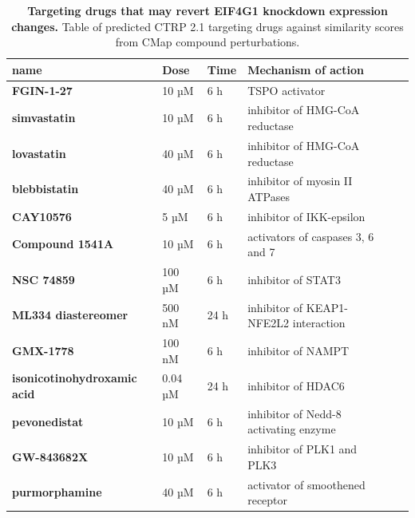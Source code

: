 \begin{table}[!h]
\centering
\footnotesize
\caption[Table of targeting drugs that may revert EIF4G1 knockdown expression changes]{\textbf{Targeting drugs that may revert EIF4G1 knockdown expression changes.} Table of predicted CTRP 2.1 targeting drugs against similarity scores from CMap compound perturbations.}
\label{tab:ctrap-target-revert-table}

\begin{tabular}{llllll}
\toprule
\textbf{name}                       & \textbf{Dose} & \textbf{Time} & \textbf{Mechanism of action} \\
\midrule
\textbf{FGIN-1-27}                  & 10 µM                & 6 h                  & TSPO activator \\
\textbf{simvastatin}                & 10 µM                & 6 h                  & inhibitor of HMG-CoA reductase                                       \\
\textbf{lovastatin}                 & 40 µM                & 6 h                  & inhibitor of HMG-CoA reductase                                       \\
\textbf{blebbistatin}               & 40 µM                & 6 h                  & inhibitor of myosin II ATPases                                       \\
\textbf{CAY10576}                   & 5 µM                 & 6 h                  & inhibitor of IKK-epsilon                                             \\
\textbf{Compound 1541A}             & 10 µM                & 6 h                  & activators of caspases 3, 6 and 7                    \\
\textbf{NSC 74859}                  & 100 µM               & 6 h                  & inhibitor of STAT3                                                   \\
\textbf{ML334 diastereomer}         & 500 nM               & 24 h                 & inhibitor of KEAP1-NFE2L2 interaction                \\
\textbf{GMX-1778}                   & 100 nM               & 6 h                  & inhibitor of NAMPT                  \\
\textbf{isonicotinohydroxamic acid} & 0.04 µM              & 24 h                 & inhibitor of HDAC6                                                   \\
\textbf{pevonedistat}               & 10 µM                & 6 h                  & inhibitor of Nedd-8 activating enzyme                                \\
\textbf{GW-843682X}                 & 10 µM                & 6 h                  & inhibitor of PLK1 and PLK3                                           \\
\textbf{purmorphamine}              & 40 µM                & 6 h                  & activator of smoothened receptor                                    \\
\bottomrule
\end{tabular}
\end{table}

